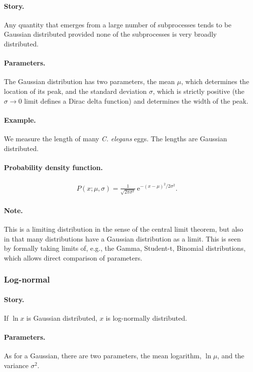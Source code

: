 \paragraph{Story.} Any quantity that emerges from a large number of
subprocesses tends to be Gaussian distributed provided none of the
subprocesses is very broadly distributed.
\paragraph{Parameters.} The Gaussian distribution has two parameters,
the mean $\mu$, which determines the location of its peak, and the
standard deviation $\sigma$, which is strictly positive (the
$\sigma\to 0$ limit defines a Dirac delta function) and determines the
width of the peak.
\paragraph{Example.} We measure the length of many \textit{C. elegans}
eggs.  The lengths are Gaussian distributed.
\paragraph{Probability density function.}
\begin{align}
P(x;\mu, \sigma) = \frac{1}{\sqrt{2\pi \sigma^2}}\,\mathrm{e}^{-(x-\mu)^2/2\sigma^2}.
\end{align}
\paragraph{Note.} This is a limiting distribution in the sense of the
central limit theorem, but also in that many distributions have a
Gaussian distribution as a limit.  This is seen by formally taking
limits of, e.g., the Gamma, Student-t, Binomial distributions, which
allows direct comparison of parameters.


\subsubsection{Log-normal}
\paragraph{Story.} If $\ln x$ is Gaussian distributed, $x$ is
log-normally distributed.
\paragraph{Parameters.} As for a Gaussian, there are two parameters,
the mean logarithm, $\ln \mu$, and the variance $\sigma^2$.
